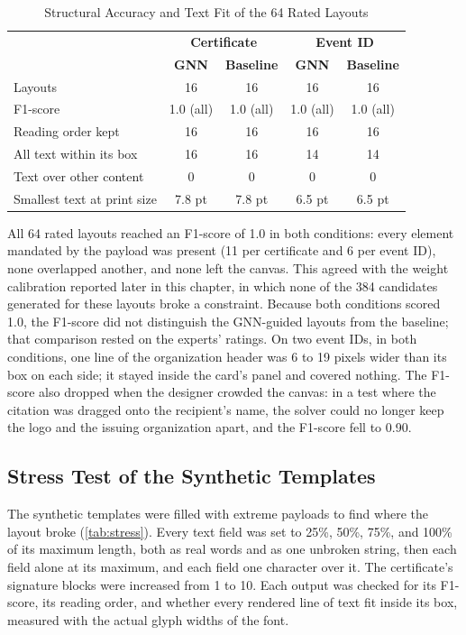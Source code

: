 \begin{refsection}
\begin{table}[ht]
\centering
\caption{Structural Accuracy and Text Fit of the 64 Rated Layouts}
\label{tab:rated-f1}
\small
\begin{tabular}{l c c c c}
\hline
 & \multicolumn{2}{c}{\textbf{Certificate}} & \multicolumn{2}{c}{\textbf{Event ID}} \\
 & \textbf{GNN} & \textbf{Baseline} & \textbf{GNN} & \textbf{Baseline} \\ \hline
Layouts & 16 & 16 & 16 & 16 \\
F1-score & 1.0 (all) & 1.0 (all) & 1.0 (all) & 1.0 (all) \\
Reading order kept & 16 & 16 & 16 & 16 \\
All text within its box & 16 & 16 & 14 & 14 \\
Text over other content & 0 & 0 & 0 & 0 \\
Smallest text at print size & 7.8 pt & 7.8 pt & 6.5 pt & 6.5 pt \\ \hline
\end{tabular}
\end{table}

All 64 rated layouts reached an F1-score of 1.0 in both conditions: every element mandated by the payload was present (11 per certificate and 6 per event ID), none overlapped another, and none left the canvas. This agreed with the weight calibration reported later in this chapter, in which none of the 384 candidates generated for these layouts broke a constraint. Because both conditions scored 1.0, the F1-score did not distinguish the GNN-guided layouts from the baseline; that comparison rested on the experts' ratings. On two event IDs, in both conditions, one line of the organization header was 6 to 19 pixels wider than its box on each side; it stayed inside the card's panel and covered nothing. The F1-score also dropped when the designer crowded the canvas: in a test where the citation was dragged onto the recipient's name, the solver could no longer keep the logo and the issuing organization apart, and the F1-score fell to 0.90.

\subsection{Stress Test of the Synthetic Templates}

The synthetic templates were filled with extreme payloads to find where the layout broke (\ref{tab:stress}). Every text field was set to 25\%, 50\%, 75\%, and 100\% of its maximum length, both as real words and as one unbroken string, then each field alone at its maximum, and each field one character over it. The certificate's signature blocks were increased from 1 to 10. Each output was checked for its F1-score, its reading order, and whether every rendered line of text fit inside its box, measured with the actual glyph widths of the font.


\end{refsection}

